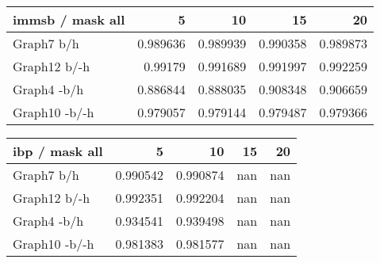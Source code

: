 

\begin{table*} 
\begin{minipage}[h]{0.45\linewidth}
\begin{tabular}{lrrrr}
\hline
 immsb / mask all   &        5 &       10 &       15 &       20 \\
\hline
 Graph7 b/h         & 0.989636 & 0.989939 & 0.990358 & 0.989873 \\
 Graph12 b/-h       & 0.99179  & 0.991689 & 0.991997 & 0.992259 \\
 Graph4 -b/h        & 0.886844 & 0.888035 & 0.908348 & 0.906659 \\
 Graph10 -b/-h      & 0.979057 & 0.979144 & 0.979487 & 0.979366 \\
\hline
\end{tabular}
\end{minipage}
\hspace{0.5cm}
\begin{minipage}[h]{0.45\linewidth}
\begin{tabular}{lrrrr}
\hline
 ibp / mask all   &        5 &       10 &   15 &   20 \\
\hline
 Graph7 b/h       & 0.990542 & 0.990874 &  nan &  nan \\
 Graph12 b/-h     & 0.992351 & 0.992204 &  nan &  nan \\
 Graph4 -b/h      & 0.934541 & 0.939498 &  nan &  nan \\
 Graph10 -b/-h    & 0.981383 & 0.981577 &  nan &  nan \\
\hline
\end{tabular}
\end{minipage}
\end{table*}
